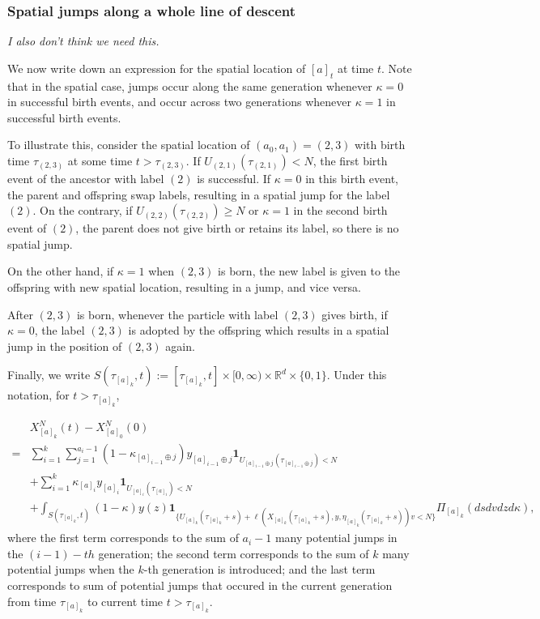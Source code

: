 \documentclass[12pt]{article}
\newcommand{\ind}{\mathbf{1}}
\newcommand{\concat}{\oplus}   %
\newcommand{\comment}[1]{{\color{blue} \it #1}}
\begin{document}
\subsubsection{Spatial jumps along a whole line of descent}

\comment{I also don't think we need this.}

We now write down an expression for the
spatial location of $[a]_t$ at time $t$.
Note that in the spatial case,
jumps occur along the same generation
whenever $\kappa = 0$ in successful birth events,
and occur across two generations
whenever $\kappa = 1$ in successful birth
events.

To illustrate this, consider the spatial location of $(a_0,a_1)=(2,3)$ with birth time $\tau_{(2,3)}$ at some time $t>\tau_{(2,3)}$.
If $U_{(2,1)}(\tau_{(2,1)}) < N$,
the first birth event of the ancestor
with label $(2)$
is successful.
If $\kappa = 0$ in this birth event,
the parent and offspring swap labels,
resulting in
a spatial jump for the label $(2)$.
On the contrary, 
if $U_{(2,2)}(\tau_{(2,2)}) \geq N$
or $\kappa = 1$
in the second birth event of $(2)$,
the parent does not give birth
or retains its label,
so there is no spatial jump.

On the other hand, 
if $\kappa=1$ when $(2,3)$ is born,
the new label is given to
the offspring
with new spatial location,
resulting in a jump,
and vice versa.

After $(2,3)$ is born,
whenever the particle with label
$(2,3)$ gives birth, 
if $\kappa = 0$, the label $(2,3)$
is adopted by the offspring
which results in a spatial jump
in the position of $(2,3)$
again. 

Finally, we write $S(\tau_{[a]_k},t):=[\tau_{[a]_k},t]\times[0,\infty)\times\mathbb{R}^d \times \{0,1\}$.
Under this notation, for $t>\tau_{[a]_k}$,


\begin{equation}
\label{eq: space_across_lineage}
\begin{aligned}
&X^{N}_{[a]_{k}}(t)- X^{N}_{[a]_{0}}(0)\\
=& \sum_{i=1}^{k}
\sum_{j=1}^{a_i-1}
(1-\kappa_{[a]_{i-1}\concat j}) y_{[a]_{i-1}\concat j} \ind_{U_{[a]_{i-1}\concat j}(\tau_{[a]_{i-1}\concat j}) < N}\\
&+ \sum_{i=1}^{k}
\kappa_{[a]_i} y_{[a]_i} \ind_{U_{[a]_i}(\tau_{[a]_i}) < N}\\
&+\int_{S(\tau_{[a]_k},t)}
(1-\kappa)y(z)
\ind_{ \{
        U_{[a]_k}(\tau_{[a]_k}+s)
        + \ell(X_{[a]_k}(\tau_{[a]_k}+s),y,\eta_{[a]_k}(\tau_{[a]_k}+s)) v < N
        \}
      } 
\Pi_{[a]_k}(dsdvdzd\kappa),
\end{aligned}    
\end{equation}
where the first term
corresponds to 
the sum of $a_{i}-1$ many potential jumps
in the $(i-1)-th$ generation;
the second term corresponds to 
the sum of $k$ many potential jumps
when the $k$-th generation is introduced;
and the last term
corresponds to sum of 
potential jumps that occured in
the current generation from 
time $\tau_{[a]_k}$
to current time $t >\tau_{[a]_k}$.
\end{document}
